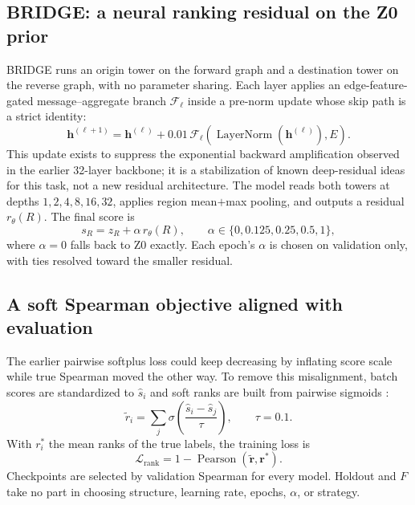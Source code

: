 \documentclass[5p,twocolumn,authoryear]{elsarticle}
\newcommand{\zmethod}{Z0}
\newcommand{\gmethod}{BRIDGE}
\begin{document}
\subsection{\gmethod: a neural ranking residual on the \zmethod{} prior}

\gmethod{} runs an origin tower on the forward graph and a destination tower on the reverse
graph, with no parameter sharing. Each layer applies an edge-feature-gated
message--aggregate branch $\mathcal{F}_\ell$ inside a pre-norm update whose skip path is a
strict identity:
\begin{equation}
  \bm{h}^{(\ell+1)}=\bm{h}^{(\ell)}+
  0.01\,\mathcal{F}_\ell\!\left(\operatorname{LayerNorm}(\bm{h}^{(\ell)}),E\right).
  \label{eq:g3}
\end{equation}
This update exists to suppress the exponential backward amplification observed in the
earlier 32-layer backbone; it is a stabilization of known deep-residual ideas for this
task, not a new residual architecture. The model reads both towers at depths
$1,2,4,8,16,32$, applies region mean$+$max pooling, and outputs a residual $r_\theta(R)$.
The final score is
\begin{equation}
  s_R=z_R+\alpha\, r_\theta(R),\qquad
  \alpha\in\{0,0.125,0.25,0.5,1\},
  \label{eq:g4score}
\end{equation}
where $\alpha=0$ falls back to \zmethod{} exactly. Each epoch's $\alpha$ is chosen on
validation only, with ties resolved toward the smaller residual.

\subsection{A soft Spearman objective aligned with evaluation}

The earlier pairwise softplus loss could keep decreasing by inflating score scale while true
Spearman moved the other way. To remove this misalignment, batch scores are standardized to
$\hat{s}_i$ and soft ranks are built from pairwise sigmoids \citep{jagerman2022rax}:
\begin{equation}
  \widetilde r_i=\sum_j \sigma\!\left(\frac{\hat{s}_i-\hat{s}_j}{\tau}\right),
  \qquad \tau=0.1.
\end{equation}
With $r_i^*$ the mean ranks of the true labels, the training loss is
\begin{equation}
  \mathcal{L}_{\mathrm{rank}}=1-\operatorname{Pearson}
  (\widetilde{\bm r},\bm r^*).
\end{equation}
Checkpoints are selected by validation Spearman for every model. Holdout and $F$ take no
part in choosing structure, learning rate, epochs, $\alpha$, or strategy.
\end{document}
